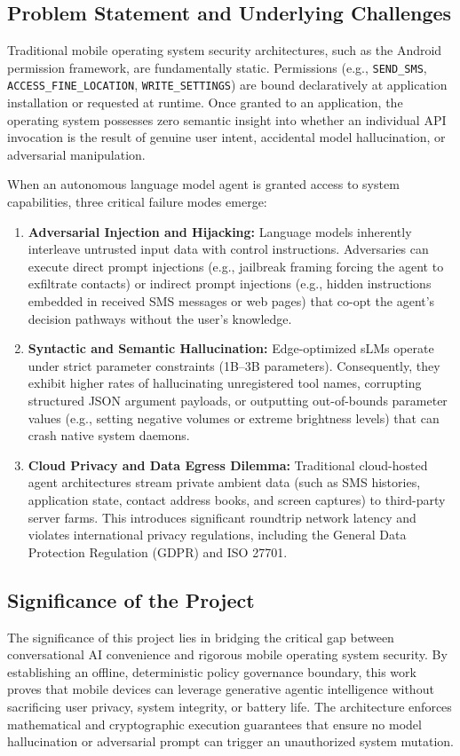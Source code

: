 \subsection{Problem Statement and Underlying Challenges}
Traditional mobile operating system security architectures, such as the Android permission framework, are fundamentally static. Permissions (e.g., \texttt{SEND\_SMS}, \texttt{ACCESS\_FINE\_LOCATION}, \texttt{WRITE\_SETTINGS}) are bound declaratively at application installation or requested at runtime. Once granted to an application, the operating system possesses zero semantic insight into whether an individual API invocation is the result of genuine user intent, accidental model hallucination, or adversarial manipulation.

When an autonomous language model agent is granted access to system capabilities, three critical failure modes emerge:
\begin{enumerate}
    \item \textbf{Adversarial Injection and Hijacking:} Language models inherently interleave untrusted input data with control instructions. Adversaries can execute direct prompt injections (e.g., jailbreak framing forcing the agent to exfiltrate contacts) or indirect prompt injections (e.g., hidden instructions embedded in received SMS messages or web pages) that co-opt the agent's decision pathways without the user's knowledge.
    \item \textbf{Syntactic and Semantic Hallucination:} Edge-optimized sLMs operate under strict parameter constraints (1B--3B parameters). Consequently, they exhibit higher rates of hallucinating unregistered tool names, corrupting structured JSON argument payloads, or outputting out-of-bounds parameter values (e.g., setting negative volumes or extreme brightness levels) that can crash native system daemons.
    \item \textbf{Cloud Privacy and Data Egress Dilemma:} Traditional cloud-hosted agent architectures stream private ambient data (such as SMS histories, application state, contact address books, and screen captures) to third-party server farms. This introduces significant roundtrip network latency and violates international privacy regulations, including the General Data Protection Regulation (GDPR) and ISO 27701.
\end{enumerate}

\subsection{Significance of the Project}
The significance of this project lies in bridging the critical gap between conversational AI convenience and rigorous mobile operating system security. By establishing an offline, deterministic policy governance boundary, this work proves that mobile devices can leverage generative agentic intelligence without sacrificing user privacy, system integrity, or battery life. The architecture enforces mathematical and cryptographic execution guarantees that ensure no model hallucination or adversarial prompt can trigger an unauthorized system mutation.


